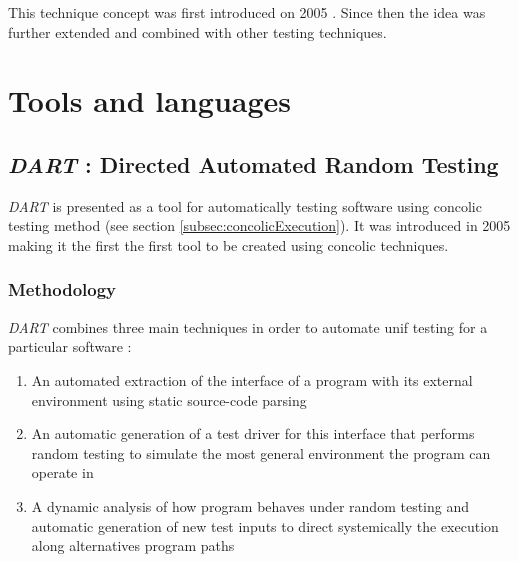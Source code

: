 \documentclass[11pt]{article}
\begin{document}
    	This technique concept was first introduced on 2005 \cite{godefroid2005dart}. %
    	Since then the idea was further extended and combined with other testing techniques.

  \section{Tools and languages}
    
    \subsection{\emph{DART} : Directed Automated Random Testing}
    	\emph{DART} is presented as a tool for automatically testing software using concolic testing method (see section \ref{subsec:concolicExecution}). It was introduced in 2005 making it the first the first tool to be created using concolic techniques. \\
    	
    	\subsubsection{Methodology}
	    	\emph{DART} combines three main techniques 	    	\cite{godefroid2005dart} in order to automate unif testing for a particular software :
	    	\begin{enumerate}
	    		\item An automated extraction of the interface of a program with its external environment using static source-code parsing
	    		\item An automatic generation of a test driver for this interface that performs random testing to simulate the most general environment the program can operate in
	    		\item A dynamic analysis of how program behaves under random testing and automatic generation of new test inputs to direct systemically the execution along alternatives program paths
	    	\end{enumerate}
	    	
	    	
\end{document}
